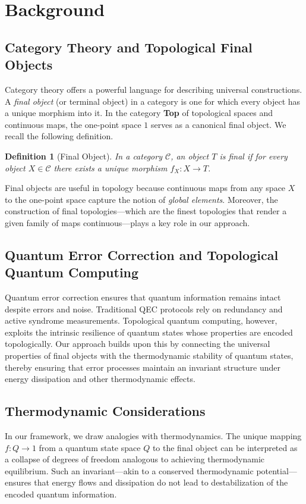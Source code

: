\documentclass[11pt]{article}
\newtheorem{definition}[theorem]{Definition}
\begin{document}
\section{Background}
\label{sec:background}

\subsection{Category Theory and Topological Final Objects}
Category theory offers a powerful language for describing universal constructions. A \emph{final object} (or terminal object) in a category is one for which every object has a unique morphism into it. In the category \textbf{Top} of topological spaces and continuous maps, the one-point space \(1\) serves as a canonical final object. We recall the following definition.

\begin{definition}[Final Object]
In a category \(\mathcal{C}\), an object \(T\) is final if for every object \(X \in \mathcal{C}\) there exists a unique morphism \(f_X: X \to T\).
\end{definition}

Final objects are useful in topology because continuous maps from any space \(X\) to the one-point space capture the notion of \emph{global elements}. Moreover, the construction of final topologies—which are the finest topologies that render a given family of maps continuous—plays a key role in our approach.

\subsection{Quantum Error Correction and Topological Quantum Computing}
Quantum error correction ensures that quantum information remains intact despite errors and noise. Traditional QEC protocols rely on redundancy and active syndrome measurements. Topological quantum computing, however, exploits the intrinsic resilience of quantum states whose properties are encoded topologically. Our approach builds upon this by connecting the universal properties of final objects with the thermodynamic stability of quantum states, thereby ensuring that error processes maintain an invariant structure under energy dissipation and other thermodynamic effects.

\subsection{Thermodynamic Considerations}
In our framework, we draw analogies with thermodynamics. The unique mapping \(f: Q \to 1\) from a quantum state space \(Q\) to the final object can be interpreted as a collapse of degrees of freedom analogous to achieving thermodynamic equilibrium. Such an invariant—akin to a conserved thermodynamic potential—ensures that energy flows and dissipation do not lead to destabilization of the encoded quantum information.
\end{document}
